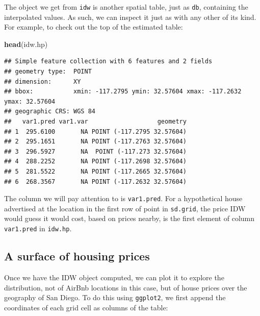 \documentclass[
]{book}
\newenvironment{Shaded}{\begin{snugshade}}{\end{snugshade}}
\newcommand{\KeywordTok}[1]{\textcolor[rgb]{0.13,0.29,0.53}{\textbf{#1}}}
\newcommand{\NormalTok}[1]{#1}
\newcommand{\OperatorTok}[1]{\textcolor[rgb]{0.81,0.36,0.00}{\textbf{#1}}}
\newcommand{\StringTok}[1]{\textcolor[rgb]{0.31,0.60,0.02}{#1}}
\begin{document}
The object we get from \texttt{idw} is another spatial table, just as \texttt{db}, containing the interpolated values. As such, we can inspect it just as with any other of its kind. For example, to check out the top of the estimated table:

\begin{Shaded}
\begin{Highlighting}[]
\KeywordTok{head}\NormalTok{(idw.hp)}
\end{Highlighting}
\end{Shaded}

\begin{verbatim}
## Simple feature collection with 6 features and 2 fields
## geometry type:  POINT
## dimension:      XY
## bbox:           xmin: -117.2795 ymin: 32.57604 xmax: -117.2632 ymax: 32.57604
## geographic CRS: WGS 84
##   var1.pred var1.var                   geometry
## 1  295.6100       NA POINT (-117.2795 32.57604)
## 2  295.1651       NA POINT (-117.2763 32.57604)
## 3  296.5927       NA  POINT (-117.273 32.57604)
## 4  288.2252       NA POINT (-117.2698 32.57604)
## 5  281.5522       NA POINT (-117.2665 32.57604)
## 6  268.3567       NA POINT (-117.2632 32.57604)
\end{verbatim}

The column we will pay attention to is \texttt{var1.pred}. For a hypothetical house advertised at the location in the first row of point in \texttt{sd.grid}, the price IDW would guess it would cost, based on prices nearby, is the first element of column \texttt{var1.pred} in \texttt{idw.hp}.

\hypertarget{a-surface-of-housing-prices}{%
\subsection{A surface of housing prices}\label{a-surface-of-housing-prices}}

Once we have the IDW object computed, we can plot it to explore the distribution, not of AirBnb locations in this case, but of house prices over the geography of San Diego. To do this using \texttt{ggplot2}, we first append the coordinates of each grid cell as columns of the table:

\begin{Shaded}
\end{Shaded}
\end{document}
